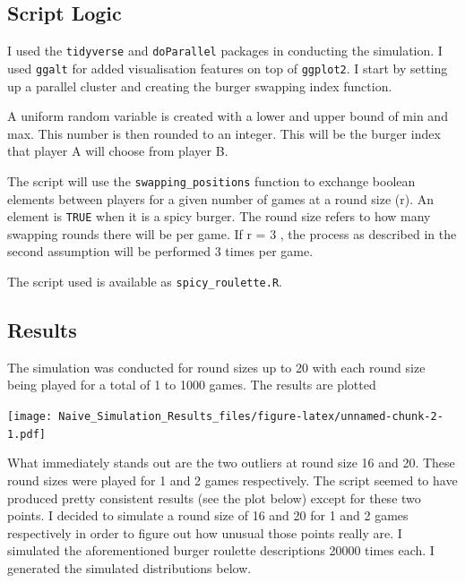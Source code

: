 \documentclass[]{article}
\newenvironment{Shaded}{\begin{snugshade}}{\end{snugshade}}
\newcommand{\KeywordTok}[1]{\textcolor[rgb]{0.13,0.29,0.53}{\textbf{#1}}}
\newcommand{\DataTypeTok}[1]{\textcolor[rgb]{0.13,0.29,0.53}{#1}}
\newcommand{\DecValTok}[1]{\textcolor[rgb]{0.00,0.00,0.81}{#1}}
\newcommand{\StringTok}[1]{\textcolor[rgb]{0.31,0.60,0.02}{#1}}
\newcommand{\ControlFlowTok}[1]{\textcolor[rgb]{0.13,0.29,0.53}{\textbf{#1}}}
\newcommand{\OperatorTok}[1]{\textcolor[rgb]{0.81,0.36,0.00}{\textbf{#1}}}
\newcommand{\NormalTok}[1]{#1}
\begin{document}
\subsection{Script Logic}\label{script-logic}

I used the \texttt{tidyverse} and \texttt{doParallel} packages in
conducting the simulation. I used \texttt{ggalt} for added visualisation
features on top of \texttt{ggplot2}. I start by setting up a parallel
cluster and creating the burger swapping index function.

\begin{Shaded}
\end{Shaded}

A uniform random variable is created with a lower and upper bound of min
and max. This number is then rounded to an integer. This will be the
burger index that player A will choose from player B.

The script will use the \texttt{swapping\_positions} function to
exchange boolean elements between players for a given number of games at
a round size (r). An element is \texttt{TRUE} when it is a spicy burger.
The round size refers to how many swapping rounds there will be per
game. If r = 3 , the process as described in the second assumption will
be performed 3 times per game.

The script used is available as \texttt{spicy\_roulette.R}.

\subsection{Results}\label{results}

The simulation was conducted for round sizes up to 20 with each round
size being played for a total of 1 to 1000 games. The results are
plotted

\texttt{[image: Naive\_Simulation\_Results\_files/figure-latex/unnamed-chunk-2-1.pdf]}

What immediately stands out are the two outliers at round size 16 and
20. These round sizes were played for 1 and 2 games respectively. The
script seemed to have produced pretty consistent results (see the plot
below) except for these two points. I decided to simulate a round size
of 16 and 20 for 1 and 2 games respectively in order to figure out how
unusual those points really are. I simulated the aforementioned burger
roulette descriptions 20000 times each. I generated the simulated
distributions below.
\end{document}
